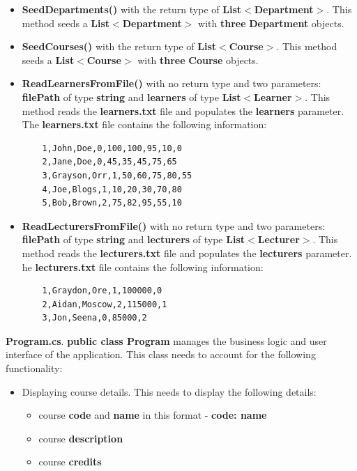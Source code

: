 \documentclass{article}
\begin{document}
\begin{itemize}
\begin{itemize}
\begin{itemize}
            \item \textbf{SeedDepartments()} with the return type of \textbf{List$<$Department$>$}. This method seeds a \textbf{List$<$Department$>$} with \textbf{three} \textbf{Department} objects.
            \item \textbf{SeedCourses()} with the return type of \textbf{List$<$Course$>$}. This method seeds a \textbf{List$<$Course$>$} with \textbf{three} \textbf{Course} objects. 
            \item \textbf{ReadLearnersFromFile()} with no return type and two parameters: \textbf{filePath} of type \textbf{string} and \textbf{learners} of type \textbf{List$<$Learner$>$}. This method reads the \textbf{learners.txt} file and populates the \textbf{learners} parameter. The \textbf{learners.txt} file contains the following information:\\
            \begin{verbatim}
	1,John,Doe,0,100,100,95,10,0
	2,Jane,Doe,0,45,35,45,75,65
	3,Grayson,Orr,1,50,60,75,80,55
	4,Joe,Blogs,1,10,20,30,70,80
	5,Bob,Brown,2,75,82,95,55,10
            \end{verbatim}
            \item \textbf{ReadLecturersFromFile()} with no return type and two parameters: \textbf{filePath} of type \textbf{string} and \textbf{lecturers} of type \textbf{List$<$Lecturer$>$}. This method reads the \textbf{lecturers.txt} file and populates the \textbf{lecturers} parameter. he \textbf{lecturers.txt} file contains the following information:\\
            \begin{verbatim}
	1,Graydon,Ore,1,100000,0
	2,Aidan,Moscow,2,115000,1
	3,Jon,Seena,0,85000,2
            \end{verbatim}
        \end{itemize}
        \textbf{Program.cs}. \textbf{public class Program} manages the business logic and user interface of the application. This class needs to account for the following functionality:
        \begin{itemize}
            \item Displaying course details. This needs to display the following details:
            \begin{itemize}
                \item course \textbf{code} and \textbf{name} in this format - \textbf{code: name}
                \item course \textbf{description}
                \item course \textbf{credits}

\end{itemize}
\end{itemize}
\end{itemize}
\end{itemize}
\end{document}
